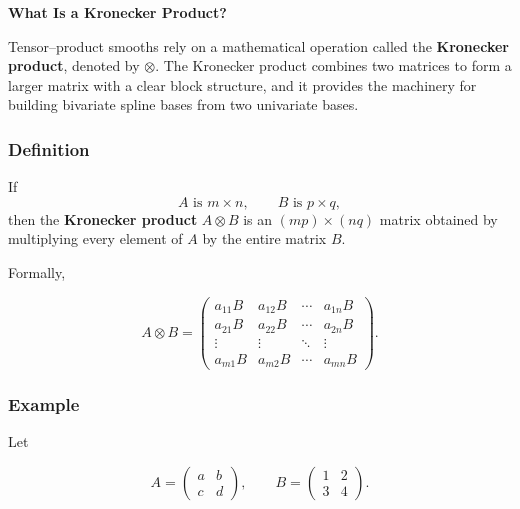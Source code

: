 \documentclass[
  letterpaper,
  DIV=11,
  numbers=noendperiod]{scrreprt}
\begin{document}
\begin{tcolorbox}[enhanced jigsaw, rightrule=.15mm, breakable, left=2mm, colframe=quarto-callout-tip-color-frame, opacityback=0, leftrule=.75mm, toprule=.15mm, colback=white, arc=.35mm, bottomrule=.15mm]

\textbf{What Is a Kronecker Product?}\vspace{2mm}

Tensor--product smooths rely on a mathematical operation called the
\textbf{Kronecker product}, denoted by \(\otimes\). The Kronecker
product combines two matrices to form a larger matrix with a clear block
structure, and it provides the machinery for building bivariate spline
bases from two univariate bases.

\hypertarget{definition}{%
\subsubsection*{Definition}\label{definition}}

If \[
A \text{ is } m \times n, \qquad B \text{ is } p \times q,
\] then the \textbf{Kronecker product} \(A \otimes B\) is an
\((mp) \times (nq)\) matrix obtained by multiplying every element of
\(A\) by the entire matrix \(B\).

Formally,

\[
A \otimes B =
\begin{pmatrix}
a_{11} B & a_{12} B & \cdots & a_{1n} B \\
a_{21} B & a_{22} B & \cdots & a_{2n} B \\
\vdots   & \vdots   & \ddots & \vdots   \\
a_{m1} B & a_{m2} B & \cdots & a_{mn} B 
\end{pmatrix}.
\]

\hypertarget{example}{%
\subsubsection*{Example}\label{example}}

Let

\[
A = \begin{pmatrix} a & b \\ c & d \end{pmatrix},
\qquad
B = \begin{pmatrix} 1 & 2 \\ 3 & 4 \end{pmatrix}.
\]


\end{tcolorbox}
\end{document}
